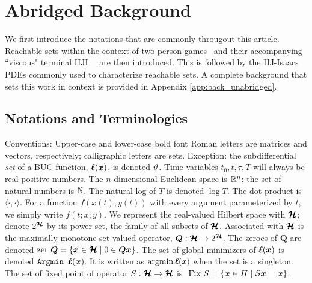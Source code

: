 \section{Abridged Background}
\label{sec:back}

We first introduce the notations that are commonly througout this article. Reachable sets within the context of  two person games~\citet{Isaacs1965} and their accompanying  ``viscous" terminal HJI \pde~\citet{Evans1984}\ are then  introduced. This is followed by the HJ-Isaacs PDEs commonly used to characterize reachable sets. A complete background that sets this work in context is provided in Appendix \ref{app:back_unabridged}.  %

\subsection{Notations and Terminologies}
\label{sec:back::notations}
Conventions: Upper-case and lower-case bold font Roman letters are matrices and vectors, respectively; calligraphic letters are sets. Exception: the subdifferential \textit{set} of a BUC function, $\bm{\ell}(\bm{x})$, is denoted $\vartheta$. Time variables \eg $t_0, t, \tau, T$ will always be real positive numbers. The $n$-dimensional Euclidean space is  $\mathbb{R}^n$; the set of natural numbers is $\mathbb{N}$. The natural log of $T$ is denoted $\log T$. The dot product is  $\langle \cdot, \cdot \rangle$. %
For a function $f(x(t), y(t))$ with every argument parameterized by $t$,  we simply write $f(t; x, y)$. We represent the real-valued Hilbert space with $\bm{\mathcal{H}}$; denote $2^{\bm{\mathcal{H}}}$ by its power set, \ie the family of all subsets of $\bm{\mathcal{H}}$. Associated with $\bm{\mathcal{H}}$ is the maximally monotone set-valued operator, $\bm{Q}: \bm{\mathcal{H}} \rightarrow 2^{\bm{\mathcal{H}}}$. The zeroes of $\bm{Q}$ are denoted $\text{zer } \bm{Q} = \{\bm{x} \in \bm{\mathcal{H}} \mid 0 \in \bm{Q} \bm{x}\}$. The set of global minimizers of $\bm{\ell}(\bm{x})$ is denoted $\texttt{Argmin } \bm{\ell}(\bm{x})$. It is written as $\text{argmin} \, \bm{\ell}(x)$ when the set is a singleton. The set of fixed point of operator $S: \bm{\mathcal{H}}\rightarrow \bm{\mathcal{H}}$ is $\text{ Fix } S = \{\bm{x} \in H \mid S \bm{x} = \bm{x}\}$.

